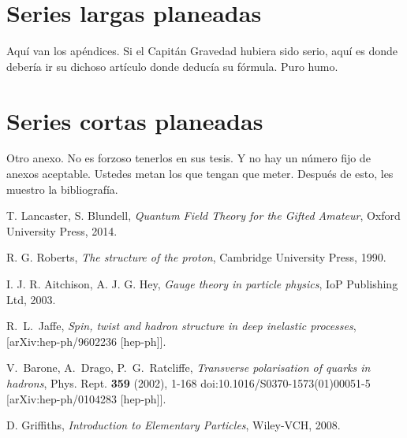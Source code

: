 \documentclass[letter,twoside,12pt]{book}
\begin{document}
\chapter{Series largas planeadas}\label{appC}
Aquí van los apéndices. Si el Capitán Gravedad hubiera sido serio, aquí es donde debería ir su dichoso artículo donde deducía su fórmula. Puro humo.
\chapter{Series cortas planeadas}
\label{D}
Otro anexo. No es forzoso tenerlos en sus tesis. Y no hay un número fijo de anexos aceptable. Ustedes metan los que tengan que meter. Después de esto, les muestro la bibliografía.
\begin{thebibliography}{99}
 T. Lancaster, S. Blundell, \textit{Quantum Field Theory for the Gifted Amateur}, Oxford University Press, 2014.

 R. G. Roberts, \textit{The structure of the proton}, Cambridge University Press, 1990.

 I. J. R. Aitchison, A. J. G. Hey, \textit{Gauge theory in particle physics}, IoP Publishing Ltd, 2003.

R.~L.~Jaffe,
\textit{Spin, twist and hadron structure in deep inelastic processes},
[arXiv:hep-ph/9602236 [hep-ph]].

V.~Barone, A.~Drago, P.~G.~Ratcliffe,
\textit{Transverse polarisation of quarks in hadrons},
Phys. Rept. \textbf{359} (2002), 1-168
doi:10.1016/S0370-1573(01)00051-5
[arXiv:hep-ph/0104283 [hep-ph]].

D. Griffiths, \textit{Introduction to Elementary Particles}, Wiley-VCH, 2008.

\end{thebibliography}
\end{document}
